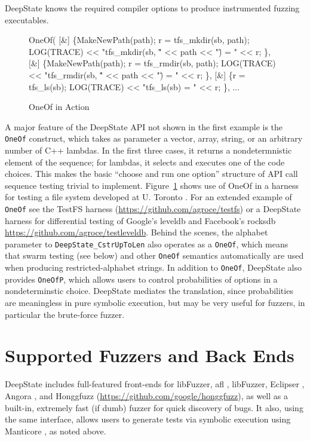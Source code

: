 \documentclass[sigconf]{acmart}
\begin{document}
\noindent DeepState knows the required compiler options to produce instrumented fuzzing executables.


\begin{figure}
{\scriptsize
\begin{code}
    OneOf(
	  [\&] \{MakeNewPath(path);
            r = tfs\_mkdir(sb, path);
            LOG(TRACE) << "tfs\_mkdir(sb, \"" << path << "\") = " << r;
	  \},
	  [\&] \{MakeNewPath(path);
            r = tfs\_rmdir(sb, path);
            LOG(TRACE) << "tfs\_rmdir(sb, \"" << path << "\") = " << r;
	  \},
	  [\&] \{r = tfs\_ls(sb);
            LOG(TRACE) << "tfs\_ls(sb) = " << r;
	  \},
   ...
\end{code}
}
  \caption{OneOf in Action}
  \label{fig:oneof}
  \end{figure}


  A major feature of the DeepState API not shown in the first example is the {\tt OneOf} construct, which takes as parameter a vector, array, string, or an arbitrary number of C++ lambdas.  In the first three cases, it returns a nondetermnistic element of the sequence; for lambdas, it selects and executes one of the code choices.  This makes the basic ``choose and run one option'' structure of API call sequence testing trivial to implement.  Figure~\ref{fig:oneof} shows use of OneOf in a harness for testing a file system developed at U. Toronto \cite{testfs}.  For an extended example of {\tt OneOf} see the TestFS harness (\url{https://github.com/agroce/testfs}) or a DeepState harness for differential testing of Google's leveldb and Facebook's rocksdb \url{https://github.com/agroce/testleveldb}.  Behind the scenes, the alphabet parameter to {\tt DeepState\_CstrUpToLen} also operates as a {\tt OneOf}, which means that swarm testing (see below) and other {\tt OneOf} semantics automatically are used when producing restricted-alphabet strings.  In addition to {\tt OneOf}, DeepState also provides {\tt OneOfP}, which allows users to control probabilities of options in a nondeterminstic choice.  DeepState mediates the translation, since probabilities are meaningless in pure symbolic execution, but may be very useful for fuzzers, in particular the brute-force fuzzer.


  
\section{Supported Fuzzers and Back Ends}

DeepState includes full-featured front-ends for libFuzzer, afl \cite{aflfuzz}, libFuzzer, Eclipser \cite{choi:icse:2019}, Angora \cite{chen2018angora}, and Honggfuzz (\url{https://github.com/google/honggfuzz}), as well as a built-in, extremely fast (if dumb) fuzzer for quick discovery of bugs.  It also, using the same interface, allows users to generate tests via symbolic execution using Manticore \cite{mossberg2019manticore}, as noted above.
\end{document}
